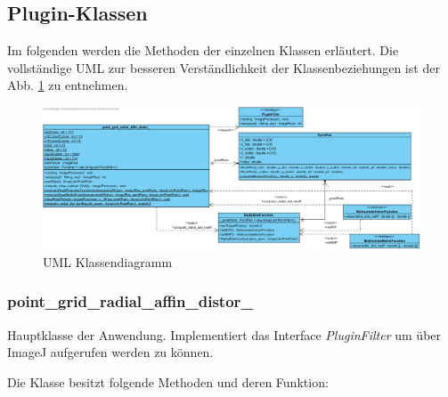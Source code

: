 \subsection{Plugin-Klassen}

Im folgenden werden die Methoden der einzelnen Klassen erläutert. Die vollständige UML zur besseren Verständlichkeit der Klassenbeziehungen ist der Abb. \ref{img:UML} zu entnehmen.

\begin{figure}
	\center
	\includegraphics[width=\textheight, angle =90]{Images/Class Diagram1.png}
	\caption{UML Klassendiagramm}
	\label{img:UML}
\end{figure}

\subsubsection{point\_grid\_radial\_affin\_distor\_}
Hauptklasse der Anwendung. Implementiert das Interface \emph{PluginFilter} um über ImageJ aufgerufen werden zu können.

Die Klasse besitzt folgende Methoden und deren Funktion:

